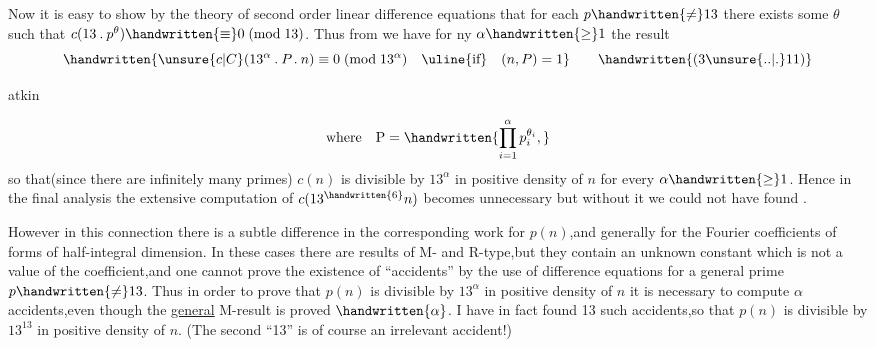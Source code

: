 Now it is easy to show by the theory of second order linear difference equations that for each $p\handwritten{\ne}13$ there exists some $\theta$ such that $c(13\mathbin{.}p^{\theta})\handwritten{\equiv}0\;(\mathrm{mod}\;13)$. Thus from  we have for ny $\alpha\handwritten{\geq}1$ the result
\[
\handwritten{\unsure{c|C}(13^{\alpha}\mathbin{.}P\mathbin{.}n)\equiv0\;(\mathrm{mod}\;13^{\alpha})\quad\text{\uline{if}}\quad(n,P)=1}
\tag*{\handwritten{(3\unsure{..|.}11)}}
\]


\noindent\hfill atkin 

\[
\text{where}\quad\mathrm{P}=\handwritten{\prod_{i=1}^{\alpha}p_i^{\theta_i},}
\]
\noindent so that(since there are infinitely many primes) \uline{$c(n)$} is divisible by $13^{\alpha}$ in positive density of $n$ for every $\alpha\handwritten{\geq}1$. Hence in the final analysis the extensive computation of $c(13^{\handwritten{6}}n)$ becomes unnecessary  but without it we could not have found .

However in this connection there is a subtle difference in the corresponding work for \uline{$p(n)$},and generally for the Fourier coefficients of forms of half-integral dimension. In these cases there are results of M- and R-type,but they contain an unknown constant which is not a value of the coefficient,and one cannot prove the existence of ``accidents'' by the use of difference equations for a general prime $p\handwritten{\ne}13$. Thus in order to prove that \uline{$p(n)$} is divisible by $13^{\alpha}$ in positive density of \uline{$n$} it is necessary to compute $\alpha$ accidents,even though the \uline{general} M-result is proved  $\handwritten{\alpha}$.\margin{\handwritten{\rlap{$\unsure{\delta|\text{\S}}$}/}} I have in fact found 13 such accidents,so that \uline{$p(n)$} is divisible by $13^{13}$ in positive density of $n$. (The second ``13'' is of course an irrelevant accident!)

